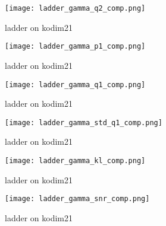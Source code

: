 \begin{figure}[H]
  \centering
  \texttt{[image: ladder\_gamma\_q2\_comp.png]}
  \caption{ladder on kodim21}
  \label{fig:ladder_gamma_q2_comp}
\end{figure}
\begin{figure}[H]
  \centering
  \texttt{[image: ladder\_gamma\_p1\_comp.png]}
  \caption{ladder on kodim21}
  \label{fig:ladder_gamma_p1_comp}
\end{figure}
\begin{figure}[H]
  \centering
  \texttt{[image: ladder\_gamma\_q1\_comp.png]}
  \caption{ladder on kodim21}
  \label{fig:ladder_gamma_q1_comp}
\end{figure}
\begin{figure}[H]
  \centering
  \texttt{[image: ladder\_gamma\_std\_q1\_comp.png]}
  \caption{ladder on kodim21}
  \label{fig:ladder_gamma_std_q1_comp}
\end{figure}
\begin{figure}[H]
  \centering
  \texttt{[image: ladder\_gamma\_kl\_comp.png]}
  \caption{ladder on kodim21}
  \label{fig:ladder_gamma_kl_comp}
\end{figure}
\begin{figure}[H]
  \centering
  \texttt{[image: ladder\_gamma\_snr\_comp.png]}
  \caption{ladder on kodim21}
  \label{fig:ladder_gamma_snr_comp}
\end{figure}

